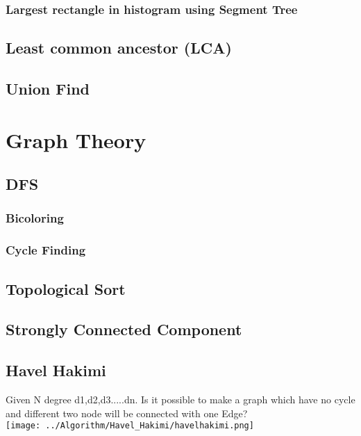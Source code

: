 \documentclass[11pt]{report}
\begin{document}
\subsection{Largest rectangle in histogram using Segment Tree}


\section{Least common ancestor (LCA)}

\newpage
\section{Union Find}




\chapter{Graph Theory}
\section{DFS}
\subsection{Bicoloring}

\subsection{Cycle Finding}

\section{Topological Sort}

\section{Strongly Connected Component}

\section{Havel Hakimi}
Given N degree d1,d2,d3.....dn. Is it possible to make a graph which have no cycle and
different two node will be connected with one Edge?\\
\texttt{[image: ../Algorithm/Havel\_Hakimi/havelhakimi.png]}\\ \\

\end{document}
